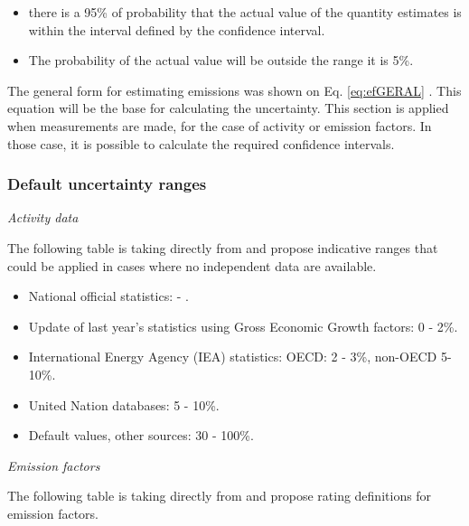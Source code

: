 \documentclass[12pt,graybox,envcountchap,sectrefs]{krantz}
\providecommand{\tightlist}{%
  \setlength{\itemsep}{0pt}\setlength{\parskip}{0pt}}
\theoremstyle{definition}
\theoremstyle{definition}
\theoremstyle{definition}
\theoremstyle{remark}
\begin{document}
\begin{itemize}
\tightlist
\item
  there is a 95\% of probability that the actual value of the quantity
  estimates is within the interval defined by the confidence interval.
\item
  The probability of the actual value will be outside the range it is
  5\%.
\end{itemize}

The general form for estimating emissions was shown on Eq.
\eqref{eq:efGERAL} \citep{guiau}. This equation will be the base for
calculating the uncertainty. This section is applied when measurements
are made, for the case of activity or emission factors. In those case,
it is possible to calculate the required confidence intervals.

\subsubsection{Default uncertainty
ranges}\label{default-uncertainty-ranges}

\emph{Activity data}

The following table is taking directly from \citet{guia} and propose
indicative ranges that could be applied in cases where no independent
data are available.

\begin{itemize}
\tightlist
\item
  National official statistics: - .
\item
  Update of last year's statistics using Gross Economic Growth factors:
  0 - 2\%.
\item
  International Energy Agency (IEA) statistics: OECD: 2 - 3\%, non-OECD
  5-10\%.
\item
  United Nation databases: 5 - 10\%.
\item
  Default values, other sources: 30 - 100\%.
\end{itemize}

\emph{Emission factors}

The following table is taking directly from \citet{guia} and propose
rating definitions for emission factors\citep{guia}.
\end{document}
